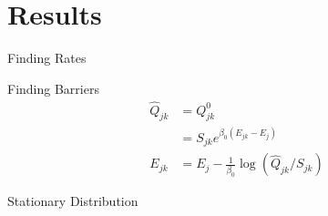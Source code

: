 \documentclass{beamer}
\begin{document}
\section{Results}
\begin{frame}{Finding Rates}
\end{frame}
\begin{frame}{Finding Barriers}
\begin{align}
\hat{Q}_{jk} &= Q^0_{jk} \\
	&= S_{jk}e^{\beta_0(E_{jk} - E_j)} \\
E_{jk} &= E_j-\frac{1}{\beta_0}\log\left(\hat{Q}_{jk}/S_{jk}\right)
\end{align}
\end{frame}
\begin{frame}{Stationary Distribution}
  \centering
\end{frame}
\end{document}
